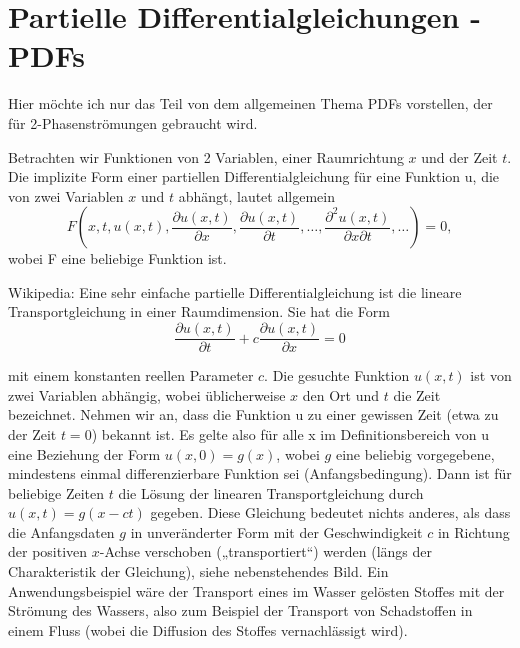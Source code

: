 \section{Partielle Differentialgleichungen - PDFs }\label{sec:pdg}

Hier möchte ich nur das Teil von dem allgemeinen Thema PDFs
vorstellen, der für 2-Phasenströmungen gebraucht wird.  

Betrachten wir Funktionen von 2 Variablen, einer Raumrichtung $x$ und
der Zeit $t$.  Die implizite Form einer partiellen
Differentialgleichung für eine Funktion u, die von zwei Variablen $x$
und $t$ abhängt, lautet allgemein
\begin{equation}
    F\left(x,t,u(x,t),\frac{\partial u(x,t)}{\partial
      x},\frac{\partial u(x,t)}{\partial t}, \ldots,\frac{\partial^2
      u(x,t)}{\partial x \partial t},\ldots \right) = 0,
\end{equation}
wobei F eine beliebige Funktion ist.

Wikipedia: Eine sehr einfache partielle Differentialgleichung ist die
lineare Transportgleichung in einer Raumdimension. Sie hat die Form
\begin{equation}
\frac{\partial u(x,t)}{\partial t} + c \frac{\partial u(x,t)}{\partial
  x} = 0
\end{equation}

mit einem konstanten reellen Parameter $c$. Die gesuchte Funktion $u(x,t)$
ist von zwei Variablen abhängig, wobei üblicherweise $x$ den Ort und $t$
die Zeit bezeichnet. Nehmen wir an, dass die Funktion u zu einer
gewissen Zeit (etwa zu der Zeit $t=0$) bekannt ist. Es gelte also für
alle x im Definitionsbereich von u eine Beziehung der Form
$u(x,0)=g(x)$, wobei $g$ eine beliebig vorgegebene, mindestens einmal
differenzierbare Funktion sei (Anfangsbedingung). Dann ist für
beliebige Zeiten $t$ die Lösung der linearen Transportgleichung durch
$u(x,t) = g(x-ct)$ gegeben. Diese Gleichung bedeutet nichts anderes,
als dass die Anfangsdaten $g$ in unveränderter Form mit der
Geschwindigkeit $c$ in Richtung der positiven $x$-Achse verschoben
(„transportiert“) werden (längs der Charakteristik der Gleichung),
siehe nebenstehendes Bild. Ein Anwendungsbeispiel wäre der Transport
eines im Wasser gelösten Stoffes mit der Strömung des Wassers, also
zum Beispiel der Transport von Schadstoffen in einem Fluss (wobei die
Diffusion des Stoffes vernachlässigt wird).

